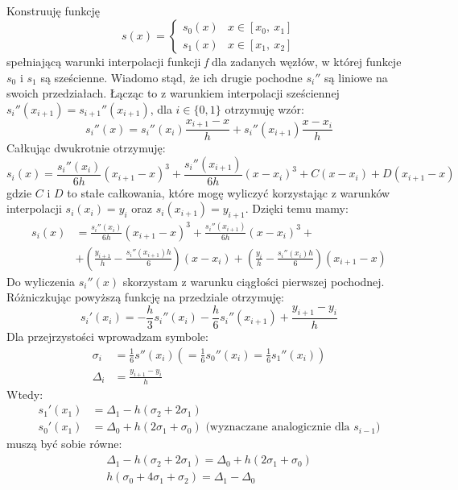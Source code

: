 \documentclass{article}
\begin{document}
\subsection{}
Konstruuję funkcję
\[s(x) =
\begin{cases}
    s_0(x) & x \in [x_0,\ x_1]\\
    s_1(x) & x \in [x_1,\ x_2]
\end{cases}
\]
spełniającą warunki interpolacji funkcji \textit{f} dla zadanych węzłów, w której funkcje \(s_0\) i \(s_1\) są sześcienne. Wiadomo stąd, że ich drugie pochodne \(s_i''\) są liniowe na swoich przedziałach. Łącząc to z warunkiem interpolacji sześciennej\\
\(s_i''(x_{i+1}) = s_{i+1}''(x_{i+1})\), dla \(i \in \{0, 1\}\) otrzymuję wzór:
\[s_i''(x) = s_i''(x_i) \frac{x_{i+1} - x}{h} + s_i''(x_{i+1}) \frac{x - x_i}{h}\]
Całkując dwukrotnie otrzymuję:
\[s_i(x) = \frac{s_i''(x_i)}{6h}(x_{i+1} - x)^3 + \frac{s_i''(x_{i+1})}{6h}(x - x_i)^3 + C(x - x_i) + D(x_{i+1} - x)\]
gdzie \(C \text{ i } D\) to stałe całkowania, które mogę wyliczyć korzystając z warunków interpolacji \(s_i(x_i) = y_i\) oraz \(s_i(x_{i+1}) = y_{i+1}\). Dzięki temu mamy:
\begin{align*}
    s_i(x) &= \frac{s_i''(x_i)}{6h}(x_{i+1} - x)^3 + \frac{s_i''(x_{i+1})}{6h}(x - x_i)^3 +\\
    &+ \left(\frac{y_{i+1}}{h} - \frac{s_i''(x_{i+1})h}{6}\right)(x - x_i) + \left(\frac{y_i}{h} - \frac{s_i''(x_i)h}{6}\right)(x_{i+1} - x)
\end{align*}
Do wyliczenia \(s_i''(x)\) skorzystam z warunku ciągłości pierwszej pochodnej.\\
Różniczkując powyższą funkcję na przedziale otrzymuję:
\[s_i'(x_i) = -\frac{h}{3}s_i''(x_i) - \frac{h}{6}s_i''(x_{i+1}) + \frac{y_{i+1} - y_i}{h}\]
Dla przejrzystości wprowadzam symbole:
\begin{align*}
    \sigma_i &= \frac{1}{6}s''(x_i) \left(= \frac{1}{6}s_0''(x_i) = \frac{1}{6}s_1''(x_i)\right)\\
    \Delta_i &= \frac{y_{i+1} - y_i}{h}
\end{align*}
Wtedy:
\begin{align*}
    s_1'(x_1) &= \Delta_1 - h(\sigma_2 + 2\sigma_1)\\
    s_0'(x_1) &= \Delta_0 + h(2\sigma_1 + \sigma_0) \text{ (wyznaczane analogicznie dla } s_{i-1})
\end{align*}
muszą być sobie równe:
\begin{gather*}
    \Delta_1 - h(\sigma_2 + 2\sigma_1) = \Delta_0 + h(2\sigma_1 + \sigma_0)\\
    h(\sigma_0 + 4\sigma_1 + \sigma_2) = \Delta_1 - \Delta_0
\end{gather*}
\end{document}
